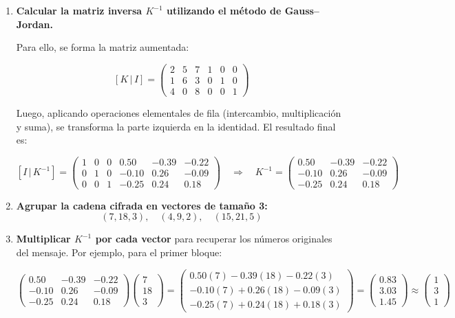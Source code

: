 \documentclass{article}%
\begin{document}
\begin{enumerate}
    \item \textbf{Calcular la matriz inversa $K^{-1}$ utilizando el método de Gauss–Jordan.}

    Para ello, se forma la matriz aumentada:

    \[
    [K \,|\, I] =
    \begin{pmatrix}
    2 & 5 & 7 & 1 & 0 & 0 \\
    1 & 6 & 3 & 0 & 1 & 0 \\
    4 & 0 & 8 & 0 & 0 & 1
    \end{pmatrix}
    \]

    Luego, aplicando operaciones elementales de fila (intercambio, multiplicación y suma), se transforma la parte izquierda en la identidad.
    El resultado final es:

    \[
    [I \,|\, K^{-1}] =
    \begin{pmatrix}
    1 & 0 & 0 & 0.50 & -0.39 & -0.22 \\
    0 & 1 & 0 & -0.10 & 0.26 & -0.09 \\
    0 & 0 & 1 & -0.25 & 0.24 & 0.18
    \end{pmatrix}
    \quad \Rightarrow \quad
    K^{-1} =
    \begin{pmatrix}
    0.50 & -0.39 & -0.22 \\
    -0.10 & 0.26 & -0.09 \\
    -0.25 & 0.24 & 0.18
    \end{pmatrix}
    \]

    \item \textbf{Agrupar la cadena cifrada en vectores de tamaño 3:}
    \[
    (7,18,3), \quad (4,9,2), \quad (15,21,5)
    \]

    \item \textbf{Multiplicar $K^{-1}$ por cada vector} para recuperar los números originales del mensaje.
    Por ejemplo, para el primer bloque:

    \[
    \begin{pmatrix}
    0.50 & -0.39 & -0.22 \\
    -0.10 & 0.26 & -0.09 \\
    -0.25 & 0.24 & 0.18
    \end{pmatrix}
    \begin{pmatrix}
    7 \\ 18 \\ 3
    \end{pmatrix}
    =
    \begin{pmatrix}
    0.50(7) - 0.39(18) - 0.22(3) \\
    -0.10(7) + 0.26(18) - 0.09(3) \\
    -0.25(7) + 0.24(18) + 0.18(3)
    \end{pmatrix}
    =
    \begin{pmatrix}
    0.83 \\ 3.03 \\ 1.45
    \end{pmatrix}
    \approx
    \begin{pmatrix}
    1 \\ 3 \\ 1
    \end{pmatrix}
    \]


\end{enumerate}
\end{document}
